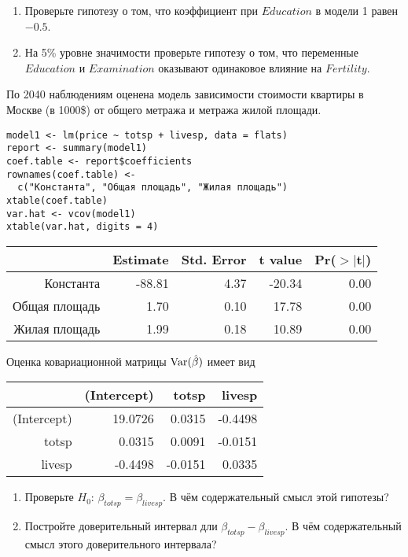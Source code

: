 \begin{problem}
\begin{enumerate}
\item Проверьте гипотезу о том, что коэффициент при $Education$ в модели 1 равен  $-0.5$.
\item На 5\% уровне значимости проверьте гипотезу о том, что
переменные $Education$ и $Examination$ оказывают одинаковое влияние на $Fertility$.
\end{enumerate}


\begin{sol}
\end{sol}
\end{problem}


\begin{problem} %
По 2040 наблюдениям оценена модель зависимости стоимости квартиры в Москве (в 1000\$) от общего метража и метража жилой площади.

\begin{verbatim}
model1 <- lm(price ~ totsp + livesp, data = flats)
report <- summary(model1)
coef.table <- report$coefficients
rownames(coef.table) <-
  c("Константа", "Общая площадь", "Жилая площадь")
xtable(coef.table)
var.hat <- vcov(model1)
xtable(var.hat, digits = 4)
\end{verbatim}

\begin{tabular}{rrrrr}
  \hline
 & Estimate & Std. Error & t value & Pr($>$$|$t$|$) \\
  \hline
Константа & -88.81 & 4.37 & -20.34 & 0.00 \\
  Общая площадь & 1.70 & 0.10 & 17.78 & 0.00 \\
  Жилая площадь & 1.99 & 0.18 & 10.89 & 0.00 \\
   \hline
\end{tabular}


Оценка ковариационной матрицы $\operatorname{Var}(\hat{\beta})$ имеет вид
\begin{tabular}{rrrr}
  \hline
 & (Intercept) & totsp & livesp \\
  \hline
(Intercept) & 19.0726 & 0.0315 & -0.4498 \\
  totsp & 0.0315 & 0.0091 & -0.0151 \\
  livesp & -0.4498 & -0.0151 & 0.0335 \\
   \hline
\end{tabular}

\begin{enumerate}
\item Проверьте $H_0$: $\beta_{totsp}=\beta_{livesp}$. В чём содержательный смысл этой гипотезы?
\item Постройте доверительный интервал дли $\beta_{totsp}-\beta_{livesp}$. В чём содержательный смысл этого доверительного интервала?
\end{enumerate}




\end{problem}

